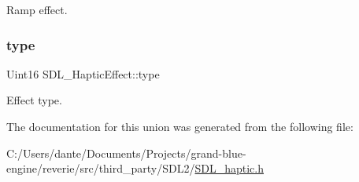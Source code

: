Ramp effect. \mbox{\label{union_s_d_l___haptic_effect_a5ff6cfd8da91537091e9a6c2108cb179}} 
\subsubsection{\texorpdfstring{type}{type}}
{\footnotesize\ttfamily Uint16 S\+D\+L\+\_\+\+Haptic\+Effect\+::type}

Effect type. 

The documentation for this union was generated from the following file\+:\begin{DoxyCompactItemize}
\item 
C\+:/\+Users/dante/\+Documents/\+Projects/grand-\/blue-\/engine/reverie/src/third\+\_\+party/\+S\+D\+L2/\mbox{\hyperlink{_s_d_l__haptic_8h}{S\+D\+L\+\_\+haptic.\+h}}\end{DoxyCompactItemize}
